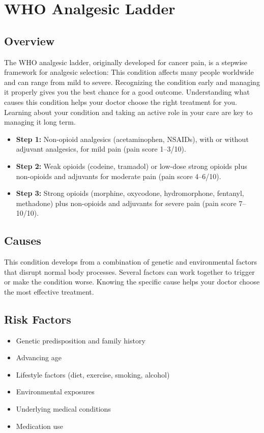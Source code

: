 \chapter{WHO Analgesic Ladder}
\label{sec:WHO Analgesic Ladder}

\section{Overview}
The WHO analgesic ladder, originally developed for cancer pain, is a stepwise framework for analgesic selection: This condition affects many people worldwide and can range from mild to severe. Recognizing the condition early and managing it properly gives you the best chance for a good outcome. Understanding what causes this condition helps your doctor choose the right treatment for you. Learning about your condition and taking an active role in your care are key to managing it long term.

\begin{itemize}[noitemsep]
  \item \textbf{Step 1:} Non-opioid analgesics (acetaminophen, NSAIDs), with or without adjuvant analgesics, for mild pain (pain score 1--3/10).
  \item \textbf{Step 2:} Weak opioids (codeine, tramadol) or low-dose strong opioids plus non-opioids and adjuvants for moderate pain (pain score 4--6/10).
  \item \textbf{Step 3:} Strong opioids (morphine, oxycodone, hydromorphone, fentanyl, methadone) plus non-opioids and adjuvants for severe pain (pain score 7--10/10).
\end{itemize}

\section{Causes}
This condition develops from a combination of genetic and environmental factors that disrupt normal body processes. Several factors can work together to trigger or make the condition worse. Knowing the specific cause helps your doctor choose the most effective treatment.

\section{Risk Factors}

\begin{itemize}[noitemsep]
  \item Genetic predisposition and family history
  \item Advancing age
  \item Lifestyle factors (diet, exercise, smoking, alcohol)
  \item Environmental exposures
  \item Underlying medical conditions
  \item Medication use
\end{itemize}

